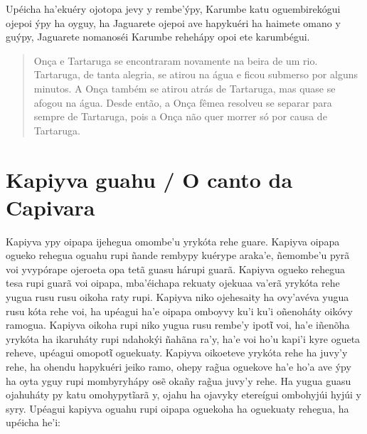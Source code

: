 
Upéicha ha'ekuéry ojotopa jevy y rembe'ýpy, Karumbe katu oguembirekógui
ojepoi ýpy ha oyguy, ha Jaguarete ojepoi ave hapykuéri ha haimete omano
y guýpy, Jaguarete nomanoséi Karumbe rehehápy opoi ete karumbégui.

\begin{quote}
Onça e Tartaruga se encontraram novamente na beira de um rio. Tartaruga,
de tanta alegria, se atirou na água e ficou submerso por alguns minutos.
A Onça também se atirou atrás de Tartaruga, mas quase se afogou na água.
Desde então, a Onça fêmea resolveu se separar para sempre de Tartaruga,
pois a Onça não quer morrer só por causa de Tartaruga.
\end{quote}

\chapter{Kapiyva guahu / O canto da Capivara}

Kapiyva ypy oipapa ijehegua omombe'u yrykóta rehe guare. Kapiyva oipapa
ogueko rehegua oguahu rupi ñande rembypy kuérype araka'e, ñemombe'u pyrã
voi yvypórape ojeroeta opa tetã guasu hárupi guarã. Kapiyva ogueko
rehegua tesa rupi guarã voi oipapa, mba'éichapa rekuaty ojekuaa va'erã
yrykóta rehe yugua rusu rusu oikoha raty rupi. Kapiyva niko ojehesaity
ha ovy'avéva yugua rusu kóta rehe voi, ha upéagui ha'e oipapa omboyvy
ku'i ku'i oñenoháty oikóvy ramogua. Kapiyva oikoha rupi niko yugua rusu
rembe'y ipotῖ voi, ha'e iñenõha yrykóta ha ikaruháty rupi ndahokýi
ñahãna ra'y, ha'e voi ho'u kapi'i kyre ogueta reheve, upéagui omopotῖ
oguekuaty. Kapiyva oikoeteve yrykóta rehe ha juvy'y rehe, ha ohendu
hapykuéri jeiko ramo, ohepy rag̃ua oguekove ha'e ho'a ave ýpy ha oyta
yguy rupi mombyryhápy osẽ okañy rag̃ua juvy'y rehe. Ha yugua guasu
ojahuháty py katu omohypytĩarã y, ojahu ha ojavyky etereígui ombohyjúi
hyjúi y syry. Upéagui kapiyva oguahu rupi oipapa oguekoha ha oguekuaty
rehegua, ha upéicha he'i:

